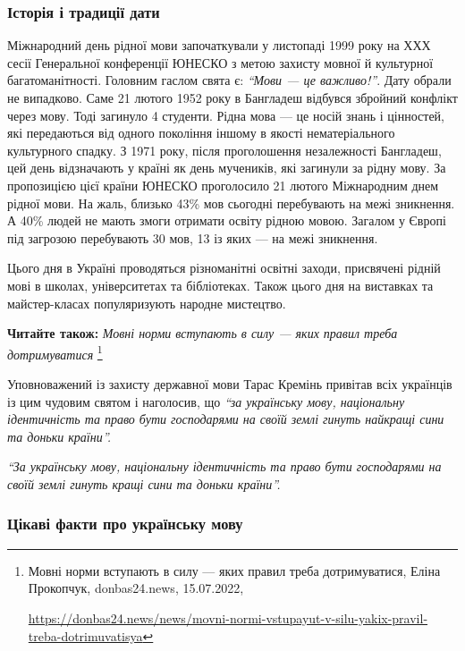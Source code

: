 \subsubsection{Історія і традиції дати}

Міжнародний день рідної мови започаткували у листопаді 1999 року на ХХХ сесії
Генеральної конференції ЮНЕСКО з метою захисту мовної й культурної
багатоманітності. Головним гаслом свята є: \emph{\enquote{Мови — це важливо!}}.
Дату обрали не випадково. Саме 21 лютого 1952 року в Бангладеш відбувся
збройний конфлікт через мову. Тоді загинуло 4 студенти. Рідна мова — це носій
знань і цінностей, які передаються від одного покоління іншому в якості
нематеріального культурного спадку. З 1971 року, після проголошення
незалежності Бангладеш, цей день відзначають у країні як день мучеників, які
загинули за рідну мову. За пропозицією цієї країни ЮНЕСКО проголосило 21 лютого
Міжнародним днем рідної мови. На жаль, близько 43\% мов сьогодні перебувають на
межі зникнення. А 40\% людей не мають змоги отримати освіту рідною мовою.
Загалом у Європі під загрозою перебувають 30 мов, 13 із яких — на межі
зникнення.

Цього дня в Україні проводяться різноманітні освітні заходи, присвячені рідній
мові в школах, університетах та бібліотеках. Також цього дня на виставках та
майстер-класах популяризують народне мистецтво.

\textbf{Читайте також:} \emph{Мовні норми вступають в силу — яких правил треба дотримуватися}%
\footnote{Мовні норми вступають в силу — яких правил треба дотримуватися, Еліна Прокопчук, donbas24.news, 15.07.2022, \par%
\url{https://donbas24.news/news/movni-normi-vstupayut-v-silu-yakix-pravil-treba-dotrimuvatisya}%
}


Уповноважений із захисту державної мови Тарас Кремінь привітав всіх українців
із цим чудовим святом і наголосив, що \emph{\enquote{за українську мову, національну
ідентичність та право бути господарями на своїй землі гинуть найкращі сини та
доньки країни}.}

\begin{leftbar}
\em\enquote{За українську мову, національну ідентичність та право бути господарями на своїй землі гинуть кращі сини та доньки країни}.
\end{leftbar}

\subsubsection{Цікаві факти про українську мову}

